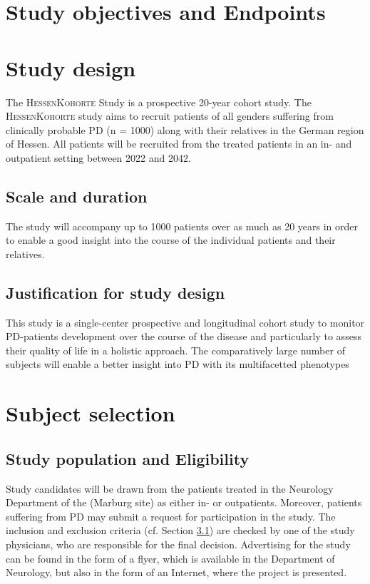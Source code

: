 \section{Study objectives and Endpoints}
\section{Study design}
The \textsc{HessenKohorte} Study is a prospective 20-year cohort study. The \textsc{HessenKohorte} study aims to recruit patients of all genders suffering from clinically probable \ac{PD} (n = 1000) along with their relatives in the German region of Hessen. All patients will be recruited from the treated patients in an in- and outpatient setting between 2022 and 2042. 

\subsection{Scale and duration}
The study will accompany up to 1000 patients over as much as 20 years in order to enable a good insight into the course of the individual patients and their relatives.
\subsection{Justification for study design}
This study is a single-center prospective and longitudinal cohort study to monitor \ac{PD}-patients development over the course of the disease and particularly to assess their quality of life in a holistic approach. The comparatively large number of subjects will enable a better insight into \ac{PD} with its multifacetted phenotypes

\section{Subject selection}
\label{sec:study_selection}
\subsection{Study population and Eligibility}
\label{sec:study_population}
Study candidates will be drawn from the patients treated in the Neurology Department of the \UKGM (Marburg site) as either in- or outpatients. Moreover, patients suffering from \ac{PD} may submit a request for participation in the study. The inclusion and exclusion criteria (cf. Section \ref{sec:study_population}) are checked by one of the study physicians, who are responsible for the final decision. Advertising for the study can be found in the form of a flyer, which is available in the Department of Neurology, but also in the form of an Internet, where the project is presented.

